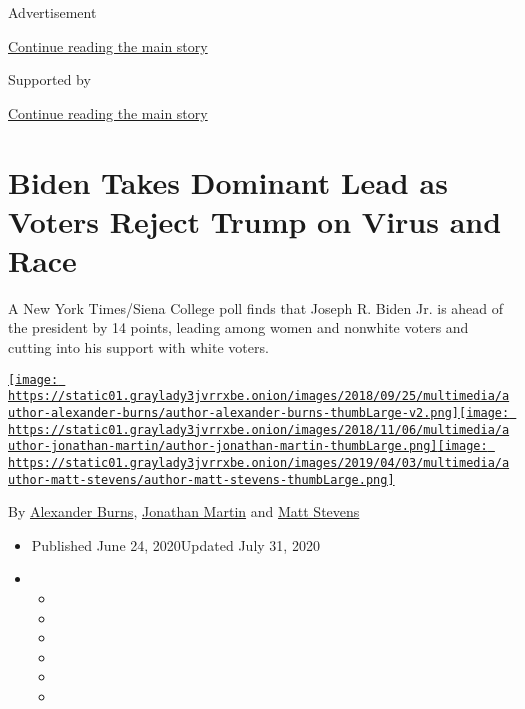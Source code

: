 Advertisement

\protect\hyperlink{after-top}{Continue reading the main story}

Supported by

\protect\hyperlink{after-sponsor}{Continue reading the main story}

\hypertarget{biden-takes-dominant-lead-as-voters-reject-trump-on-virus-and-race}{%
\section{Biden Takes Dominant Lead as Voters Reject Trump on Virus and
Race}\label{biden-takes-dominant-lead-as-voters-reject-trump-on-virus-and-race}}

A New York Times/Siena College poll finds that Joseph R. Biden Jr. is
ahead of the president by 14 points, leading among women and nonwhite
voters and cutting into his support with white voters.

\href{https://www.nytimes3xbfgragh.onion/by/alexander-burns}{\texttt{[image: https://static01.graylady3jvrrxbe.onion/images/2018/09/25/multimedia/author-alexander-burns/author-alexander-burns-thumbLarge-v2.png]}}\href{https://www.nytimes3xbfgragh.onion/by/jonathan-martin}{\texttt{[image: https://static01.graylady3jvrrxbe.onion/images/2018/11/06/multimedia/author-jonathan-martin/author-jonathan-martin-thumbLarge.png]}}\href{https://www.nytimes3xbfgragh.onion/by/matt-stevens}{\texttt{[image: https://static01.graylady3jvrrxbe.onion/images/2019/04/03/multimedia/author-matt-stevens/author-matt-stevens-thumbLarge.png]}}

By
\href{https://www.nytimes3xbfgragh.onion/by/alexander-burns}{Alexander
Burns},
\href{https://www.nytimes3xbfgragh.onion/by/jonathan-martin}{Jonathan
Martin} and
\href{https://www.nytimes3xbfgragh.onion/by/matt-stevens}{Matt Stevens}

\begin{itemize}
\item
  Published June 24, 2020Updated July 31, 2020
\item
  \begin{itemize}
  \item
  \item
  \item
  \item
  \item
  \item
  \end{itemize}
\end{itemize}

